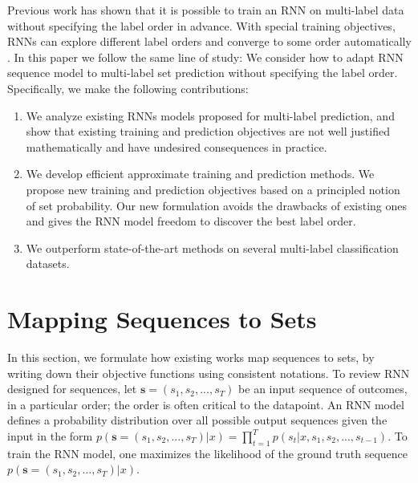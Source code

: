 Previous work has shown that it is possible to train an RNN on multi-label data without specifying the label order in advance. With special training objectives, RNNs can explore different label orders and converge to some order automatically \cite{vinyals2015order}. In this paper we follow the same line of study: We consider how to adapt RNN sequence model to multi-label set prediction without specifying the label order. Specifically, we make the following  contributions:
\begin{enumerate}
\item We analyze existing RNNs models proposed for multi-label prediction, and show that existing training and prediction objectives are not well justified mathematically and have undesired consequences in practice. 
\item  We develop efficient approximate training and prediction methods. We propose new training and prediction objectives based on a principled notion of set probability. Our new formulation avoids the drawbacks of existing ones and gives  the  RNN  model  freedom  to discover the best label order. 
\item We outperform state-of-the-art methods on several multi-label classification datasets.
\end{enumerate}

\section{Mapping Sequences to Sets} 
 In this section, we formulate how existing works map sequences to sets, by writing down their objective functions using consistent notations. To review RNN designed for sequences, let $\mathbf{s}=(s_1,s_2,...,s_T)$ be an input sequence of outcomes, in a particular order; the order is often critical to the datapoint. An RNN model defines a probability distribution over all possible output sequences given the input in the form $p(\mathbf{s}=(s_1,s_2,...,s_T)|x)=\prod_{t=1}^T p(s_t|x,s_1,s_2,...,s_{t-1})$. To train the RNN model, one maximizes the likelihood of the ground truth sequence $p(\mathbf{s}=(s_1,s_2,...,s_T)|x)$.

